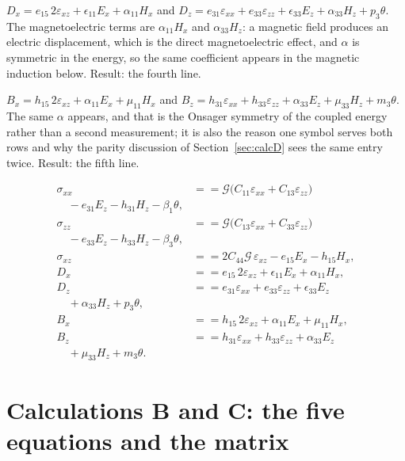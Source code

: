 \documentclass[11pt]{article}
\makeatletter
\newif\ifshowworked
\newenvironment{worked}{%
  \ifshowworked\par\smallskip\noindent\textit{Working.}\par\smallskip\else
  \setbox\z@\vbox\bgroup\fi}{\ifshowworked\par\smallskip\else\egroup\fi}
\newcommand{\Gcal}{\mathcal{G}}
\makeatother
\begin{document}
\begin{worked}
$D_x=e_{15}\,2\varepsilon_{xz}+\epsilon_{11}E_x+\alpha_{11}H_x$ and
$D_z=e_{31}\varepsilon_{xx}+e_{33}\varepsilon_{zz}+\epsilon_{33}E_z+\alpha_{33}H_z+p_3\theta$. The
magnetoelectric terms are $\alpha_{11}H_x$ and $\alpha_{33}H_z$: a magnetic field produces an electric
displacement, which is the direct magnetoelectric effect, and $\alpha$ is symmetric in the energy, so the
same coefficient appears in the magnetic induction below. Result: the fourth line.
\end{worked}

\begin{worked}
$B_x=h_{15}\,2\varepsilon_{xz}+\alpha_{11}E_x+\mu_{11}H_x$ and
$B_z=h_{31}\varepsilon_{xx}+h_{33}\varepsilon_{zz}+\alpha_{33}E_z+\mu_{33}H_z+m_3\theta$. The same
$\alpha$ appears, and that is the Onsager symmetry of the coupled energy rather than a second measurement;
it is also the reason one symbol serves both rows and why the parity discussion of
Section~\ref{sec:calcD} sees the same entry twice. Result: the fifth line.
\end{worked}

\begin{align}
\sigma_{xx}&==\Gcal\bigl(C_{11}\varepsilon_{xx}+C_{13}\varepsilon_{zz}\bigr) \\
\quad -e_{31}E_z-h_{31}H_z-\beta_1\theta, \\
\sigma_{zz}&==\Gcal\bigl(C_{13}\varepsilon_{xx}+C_{33}\varepsilon_{zz}\bigr) \\
\quad -e_{33}E_z-h_{33}H_z-\beta_3\theta, \\
\sigma_{xz}&==2C_{44}\Gcal\,\varepsilon_{xz}-e_{15}E_x-h_{15}H_x, \\
D_x&==e_{15}\,2\varepsilon_{xz}+\epsilon_{11}E_x+\alpha_{11}H_x, \\
D_z&==e_{31}\varepsilon_{xx}+e_{33}\varepsilon_{zz}+\epsilon_{33}E_z \\
\quad +\alpha_{33}H_z+p_3\theta, \\
B_x&==h_{15}\,2\varepsilon_{xz}+\alpha_{11}E_x+\mu_{11}H_x, \\
B_z&==h_{31}\varepsilon_{xx}+h_{33}\varepsilon_{zz}+\alpha_{33}E_z \\
\quad +\mu_{33}H_z+m_3\theta .
\end{align}

\section{Calculations B and C: the five equations and the matrix}\label{sec:calcBC}
\end{document}
